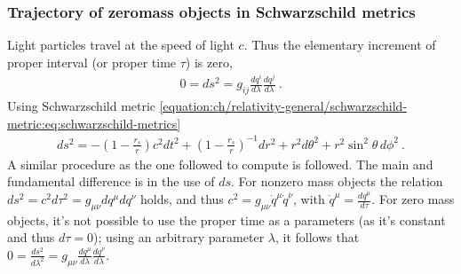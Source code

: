 \documentclass[letterpaper,10pt,english]{jupyterBook}
\begin{document}
\subsubsection{Trajectory of zero\sphinxhyphen{}mass objects in Schwarzschild metrics}
\label{\detokenize{ch/relativity-general/rays-of-light-deflection:trajectory-of-zero-mass-objects-in-schwarzschild-metrics}}\label{\detokenize{ch/relativity-general/rays-of-light-deflection:relativity-general-notes-examples-deflection-of-ray-of-light-trajectory-schwarzschild}}
\sphinxAtStartPar
Light particles travel at the speed of light \(c\). Thus the elementary increment of proper interval (or proper time \(\tau\)) is zero,
\begin{equation*}
\begin{split}0 = ds^2 = g_{ij} \frac{d q^i}{d \lambda} \frac{d q^j}{d \lambda} \ .\end{split}
\end{equation*}
\sphinxAtStartPar
Using Schwarzschild metric \eqref{equation:ch/relativity-general/schwarzschild-metric:eq:schwarzschild-metrics}
\begin{equation*}
\begin{split}
ds^2 =
- \left(1 - \frac{r_s}{r} \right) c^2 dt^2 + 
  \left(1 - \frac{r_s}{r} \right)^{-1} dr^2 + r^2 d \theta^2 + r^2 \sin^2 \theta \, d\phi^2 \ .
\end{split}
\end{equation*}
\sphinxAtStartPar
A similar procedure as the one followed to compute {\hyperref[\detokenize{ch/relativity-general/schwarzschild-orbits:relativity-general-notes-examples-schwarzschild-orbits}]{}} is followed. The main and fundamental difference is in the use of \(ds\). For non\sphinxhyphen{}zero mass objects the relation \(ds^2 = c^2 d \tau^2 = g_{\mu \nu} d q^{\mu} d q^{\nu}\) holds, and thus \(c^2 = g_{\mu \nu} \dot{q}^{\mu} \dot{q}^{\nu}\), with \(\dot{q}^{\mu} = \tfrac{d q^{\mu}}{d \tau}\). For zero mass objects, it’s not possible to use the proper time as a parameters (as it’s constant and thus \(d \tau = 0\)); using an arbitrary parameter \(\lambda\), it follows that \(0 = \frac{d s^2}{d \lambda^2} = g_{\mu \nu} \frac{d q^{\mu}}{d \lambda} \frac{d q^{\nu}}{d \lambda}\).
\end{document}
